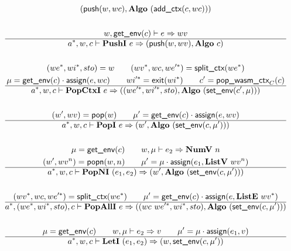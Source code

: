 \begin{gather*}
  (\push(w, wc), \algo ~ (\addctx(c, wc))) \\
%
\newline \\
  w, \getenv(c) \vdash e \Rightarrow wv \\
  \hline
  \seq{a}, w, c \vdash \pushi ~ e \Rightarrow (\push(w, wv), \algo ~ c) \\
%
\newline \\
  (\seq{we}, \seq{wi}, sto) = w \qquad
  (\seq{wv}, wc, \seq{we'}) = \splitctx(\seq{we}) \\
  \mu = \getenv(c) \cdot \assign(e, wc) \qquad
  \seq{wi'} = \exit(\seq{wi}) \qquad
  c' = \popwasmctx_{C}(c) \\
  \hline
  \seq{a}, w, c \vdash \popctxi ~ e
  \Rightarrow
  ((\seq{we'}, \seq{wi'}, sto), \algo ~ (\setenv(c', \mu))) \\
%
\newline \\
  (w', wv) = \pop(w) \qquad
  \mu' = \getenv(c) \cdot \assign(e, wv) \\
  \hline
  \seq{a}, w, c \vdash \popi ~ e \Rightarrow (w', \algo ~ (\setenv(c, \mu'))) \\
%
\newline \\
  \mu = \getenv(c) \qquad
  w, \mu \vdash e_2 \Rightarrow \numv ~ n \\
  (w', wv^n) = \popn(w, n) \qquad
  \mu' = \mu \cdot \assign(e_1, \listv ~ wv^n) \\
  \hline
  \seq{a}, w, c \vdash \popni ~ (e_1, e_2) \Rightarrow
  (w', \algo ~ (\setenv(c, \mu'))) \\
%
\newline \\
  (\seq{wv}, wc, \seq{we'}) = \splitctx(\seq{we}) \qquad
  \mu' = \getenv(c) \cdot \assign(e, \liste ~ \seq{wv}) \\
  \hline
  \seq{a}, (\seq{we}, \seq{wi}, sto), c \vdash \popalli ~ e
  \Rightarrow
  ((wc ~ \seq{we'}, \seq{wi}, sto), \algo ~ (\setenv(c, \mu'))) \\
%
\newline \\
  \mu = \getenv(c) \qquad
  w, \mu \vdash e_2 \Rightarrow v \qquad
  \mu' = \mu \cdot \assign(e_1, v) \\
  \hline
  \seq{a}, w, c \vdash \leti ~ (e_1, e_2)
  \Rightarrow
  (w, \setenv(c, \mu')) \\
%
\newline \\

\end{gather*}

